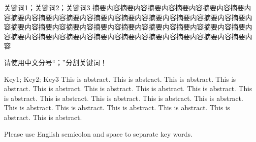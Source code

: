 
\begin{cnabstract}{关键词1；关键词2；关键词3}
  摘要内容摘要内容摘要内容摘要内容摘要内容摘要内容摘要内容摘要内容摘要内容摘要内容摘要内容摘要内容摘要内容摘要内容摘要内容摘要内容摘要内容摘要内容摘要内容摘要内容摘要内容摘要内容摘要内容摘要内容摘要内容摘要内容摘要内容摘要内容摘要内容摘要内容摘要内容摘要内容摘要内容
  
  请使用中文分号“；”分割关键词！
\end{cnabstract}


\begin{enabstract}{Key1; Key2; Key3}
  This is abstract. This is abstract. This is abstract. This is abstract. This is abstract. This is abstract. This is abstract. This is abstract. This is abstract. This is abstract. This is abstract. This is abstract. This is abstract. This is abstract. This is abstract. This is abstract. This is abstract. This is abstract. This is abstract. 

  Please use English semicolon and space to separate key words.
\end{enabstract}
